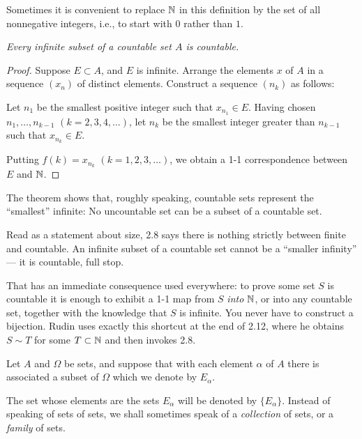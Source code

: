Sometimes it is convenient to replace $\mathbb{N}$ in this definition by the set of all
nonnegative integers, i.e., to start with $0$ rather than $1$.

\emph{Every infinite subset of a countable set $A$ is countable.}

\begin{proof}
Suppose $E \subset A$, and $E$ is infinite. Arrange the elements $x$ of $A$ in
a sequence $(x_n)$ of distinct elements. Construct a sequence $(n_k)$ as
follows:

Let $n_1$ be the smallest positive integer such that $x_{n_1} \in E$. Having
chosen $n_1,\dots,n_{k-1}$ $(k = 2,3,4,\dots)$, let $n_k$ be the smallest
integer greater than $n_{k-1}$ such that $x_{n_k} \in E$.

Putting $f(k) = x_{n_k}$ $(k = 1,2,3,\dots)$, we obtain a 1-1 correspondence
between $E$ and $\mathbb{N}$.
\end{proof}

The theorem shows that, roughly speaking, countable sets represent the
``smallest'' infinite: No uncountable set can be a subset of a countable set.

\begin{unpack}
Read as a statement about size, 2.8 says there is nothing strictly between
finite and countable. An infinite subset of a countable set cannot be a
``smaller infinity'' --- it is countable, full stop.

That has an immediate consequence used everywhere: to prove some set $S$ is
countable it is enough to exhibit a 1-1 map from $S$ \emph{into} $\mathbb{N}$, or into
any countable set, together with the knowledge that $S$ is infinite. You never
have to construct a bijection. Rudin uses exactly this shortcut at the end of
2.12, where he obtains $S \sim T$ for some $T \subset \mathbb{N}$ and then invokes 2.8.
\end{unpack}

Let $A$ and $\Omega$ be sets, and suppose that with each element $\alpha$ of
$A$ there is associated a subset of $\Omega$ which we denote by $E_\alpha$.

The set whose elements are the sets $E_\alpha$ will be denoted by
$\{E_\alpha\}$. Instead of speaking of sets of sets, we shall sometimes speak
of a \emph{collection} of sets, or a \emph{family} of sets.

